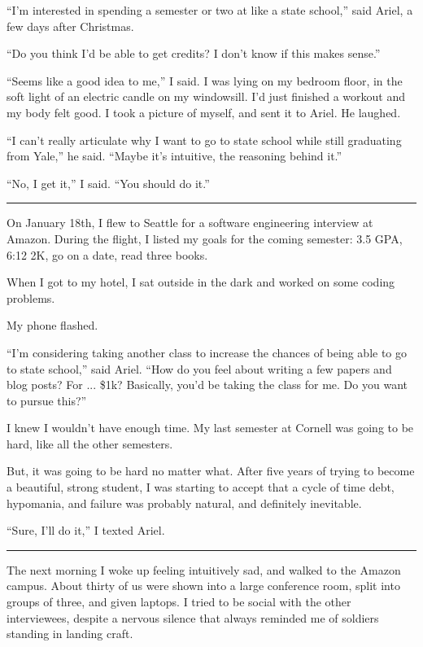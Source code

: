 ``I'm interested in spending a semester or two at like a state school,'' said
Ariel, a few days after Christmas.

``Do you think I'd be able to get credits?  I don't know if this makes sense.''

``Seems like a good idea to me,'' I said.  I was lying on my bedroom floor, in
the soft light of an electric candle on my windowsill.  I'd just finished a
workout and my body felt good.  I took a picture of myself, and sent it to
Ariel.  He laughed.

``I can't really articulate why I want to go to state school while still
graduating from Yale,'' he said. ``Maybe it's intuitive, the reasoning behind
it.''

``No, I get it,'' I said. ``You should do it.''

\plainfancybreak{12pt}{2}{}

On January 18th, I flew to Seattle for a software engineering interview at
Amazon.  During the flight, I listed my goals for the coming semester: 3.5 GPA,
6:12 2K, go on a date, read three books.

When I got to my hotel, I sat outside in the dark and worked on some coding
problems.

My phone flashed.

``I'm considering taking another class to increase the chances of being able to
go to state school,'' said Ariel.  ``How do you feel about writing a few papers
and blog posts?  For ... \$1k?  Basically, you'd be taking the class for me.  Do
you want to pursue this?''

I knew I wouldn't have enough time.  My last semester at Cornell was going to be
hard, like all the other semesters.

But, it was going to be hard no matter what.  After five years of trying to
become a beautiful, strong student, I was starting to accept that a cycle of
time debt, hypomania, and failure was probably natural, and definitely
inevitable.

``Sure, I'll do it,'' I texted Ariel.

\plainfancybreak{12pt}{2}{}

The next morning I woke up feeling intuitively sad, and walked to the Amazon
campus.  About thirty of us were shown into a large conference room, split into
groups of three, and given laptops.  I tried to be social with the other
interviewees, despite a nervous silence that always reminded me of soldiers
standing in landing craft.

